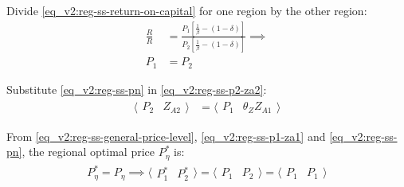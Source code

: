 \documentclass[../thesis.tex]{subfiles}
\begin{document}
Divide \ref{eq_v2:reg-ss-return-on-capital} for one region by the other region:
\begin{align}
	\frac{R}{R} &= \frac{P_{1} \left[ \frac{1}{\beta} - (1- \delta) \right]}{P_{2} \left[ \frac{1}{\beta} - (1- \delta) \right]} \implies \nonumber \\
	P_{1} &= P_{2} \label{eq_v2:reg-ss-pn}
\end{align}

Substitute \ref{eq_v2:reg-ss-pn} in \ref{eq_v2:reg-ss-p2-za2}:
\begin{align}
	\langle \begin{matrix} P_{2} & Z_{A2} \end{matrix} \rangle &= \langle \begin{matrix} P_{1} & \theta_{Z} Z_{A1} \end{matrix} \rangle \label{eq_v2:reg-ss-p2-za2-b}
\end{align}


From \ref{eq_v2:reg-ss-general-price-level}, \ref{eq_v2:reg-ss-p1-za1} and \ref{eq_v2:reg-ss-pn}, the regional optimal price $P_{\eta}^{\ast}$ is:
\begin{align}
	P_{\eta}^{\ast} = P_{\eta} \implies \langle \begin{matrix} P_{1}^{\ast} & P_{2}^{\ast} \end{matrix} \rangle = \langle \begin{matrix} P_{1} & P_{2} \end{matrix} \rangle = \langle \begin{matrix} P_{1} & P_{1} \end{matrix} \rangle \label{eq_v2:reg-ss-p1-p2}
\end{align}

\begin{comment}

Substitute \ref{eq_v2:reg-ss-p1-p2} and \ref{eq_v2:reg-ss-market-clearing-condition-Yt} in \ref{eq_v2:reg-ss-national-price-level} for the national price level:
\begin{align}
	P_{} &= \frac{P_{1} Y_{1} + P_{2} Y_{2}}{Y_{}} \tag{\ref{eq_v2:reg-ss-national-price-level}} \implies \nonumber \\
	P_{} &= \frac{P_{1} Y_{1} + \theta_{P} P_{1} Y_{2}}{Y_{}} \label{eq_v2:reg-ss-p1-p2-p}
\end{align}
	
\end{comment}
\end{document}
